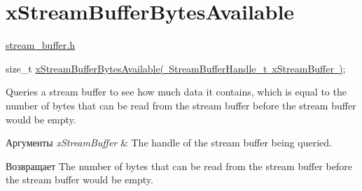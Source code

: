 \hypertarget{group__x_stream_buffer_bytes_available}{}\section{x\+Stream\+Buffer\+Bytes\+Available}
\label{group__x_stream_buffer_bytes_available}
\mbox{\hyperlink{stream__buffer_8h}{stream\+\_\+buffer.\+h}}


\begin{DoxyPre}
size\_t \mbox{\hyperlink{stream__buffer_8h_af32d1737de29f24ee31ac1e3c407d9fd}{xStreamBufferBytesAvailable( StreamBufferHandle\_t xStreamBuffer )}};
\end{DoxyPre}


Queries a stream buffer to see how much data it contains, which is equal to the number of bytes that can be read from the stream buffer before the stream buffer would be empty.


\begin{DoxyParams}{Аргументы}
{\em x\+Stream\+Buffer} & The handle of the stream buffer being queried.\\
\hline
\end{DoxyParams}
\begin{DoxyReturn}{Возвращает}
The number of bytes that can be read from the stream buffer before the stream buffer would be empty. 
\end{DoxyReturn}
